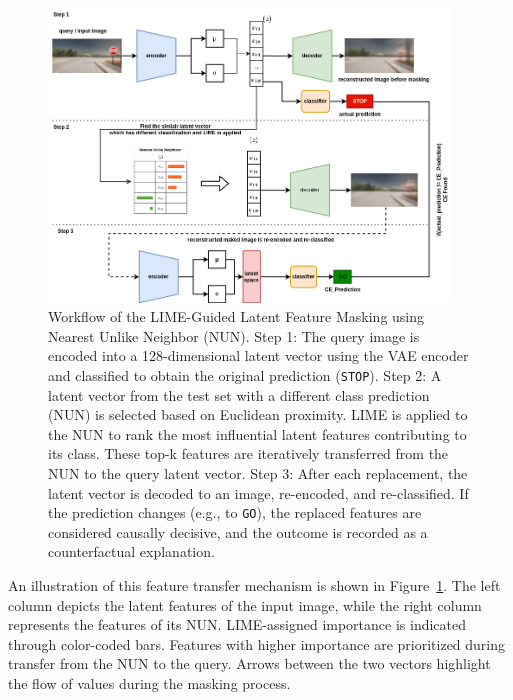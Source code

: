 \begin{figure}[htbp]
    \centering
    \includegraphics[width=0.95\textwidth]{img/masking/lime_on_latent_nun/lime_on_latent_featuring_using_NUN.png}
    \caption{
    Workflow of the LIME-Guided Latent Feature Masking using Nearest Unlike Neighbor (NUN). 
    Step 1: The query image is encoded into a 128-dimensional latent vector using the VAE encoder and classified to obtain the original prediction (\texttt{STOP}).  
    Step 2: A latent vector from the test set with a different class prediction (NUN) is selected based on Euclidean proximity. LIME is applied to the NUN to rank the most influential latent features contributing to its class. These top-k features are iteratively transferred from the NUN to the query latent vector.  
    Step 3: After each replacement, the latent vector is decoded to an image, re-encoded, and re-classified. If the prediction changes (e.g., to \texttt{GO}), the replaced features are considered causally decisive, and the outcome is recorded as a counterfactual explanation.
    }
    \label{fig:nun_lime}
\end{figure}


An illustration of this feature transfer mechanism is shown in Figure~\ref{fig:nun_lime}. The left column depicts the latent features of the input image, while the right column represents the features of its NUN. LIME-assigned importance is indicated through color-coded bars. Features with higher importance are prioritized during transfer from the NUN to the query. Arrows between the two vectors highlight the flow of values during the masking process.


